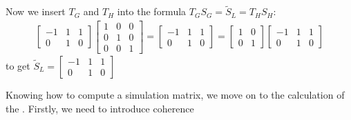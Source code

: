 Now we insert $T_G$ and $T_H$ into the formula $T_GS_G = \tilde{S}_L = T_HS_H$:
\begin{align*}
	\begin{bmatrix}  -1 & 1 & 1 \\ 0 & 1 & 0\end{bmatrix} \begin{bmatrix} 1 & 0 & 0 \\ 0 & 1 & 0 \\0 & 0 & 1 \end{bmatrix} = \begin{bmatrix}  -1 & 1 & 1 \\ 0 & 1 & 0\end{bmatrix} = \begin{bmatrix}  1 & 0 \\  0 & 1\end{bmatrix}\begin{bmatrix}  -1 & 1 & 1 \\ 0 & 1 & 0\end{bmatrix}
\end{align*}
to get $\tilde{S}_L = \begin{bmatrix}  -1 & 1 & 1 \\ 0 & 1 & 0\end{bmatrix}$ \\ \par

Knowing how to compute a simulation matrix, we move on to the calculation of the \qvasr. Firstly, we need to introduce \qvasr coherence 

